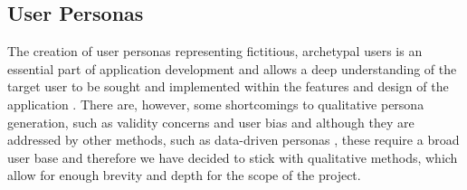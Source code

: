 \documentclass[12pt]{article}
\begin{document}
	
	
	\subsection{User Personas}
	The creation of user personas representing fictitious, archetypal users is an essential part of application development \cite{Grudin and Pruitt, 2002} and allows a deep understanding of the target user to be sought and implemented within the features and design of the application \cite{Long, 2009}. There are, however, some shortcomings to qualitative persona generation, such as validity concerns and user bias \cite{Chapman and Milham, 2007} and although they are addressed by other methods, such as data-driven personas \cite{Mcginn and Kotamraju, 2008}, these require a broad user base and therefore we have decided to stick with qualitative methods, which allow for enough brevity and depth for the scope of the project.
	
\end{document}
